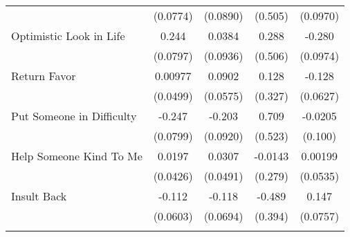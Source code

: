 {\begin{tabular}{l*{4}{c}}
            &    (0.0774)         &    (0.0890)         &     (0.505)         &    (0.0970)         \\
[1em]
Optimistic Look in Life&       0.244\sym{**} &      0.0384         &       0.288         &      -0.280\sym{**} \\
            &    (0.0797)         &    (0.0936)         &     (0.506)         &    (0.0974)         \\
[1em]
Return Favor&     0.00977         &      0.0902         &       0.128         &      -0.128\sym{*}  \\
            &    (0.0499)         &    (0.0575)         &     (0.327)         &    (0.0627)         \\
[1em]
Put Someone in Difficulty&      -0.247\sym{**} &      -0.203\sym{*}  &       0.709         &     -0.0205         \\
            &    (0.0799)         &    (0.0920)         &     (0.523)         &     (0.100)         \\
[1em]
Help Someone Kind To Me&      0.0197         &      0.0307         &     -0.0143         &     0.00199         \\
            &    (0.0426)         &    (0.0491)         &     (0.279)         &    (0.0535)         \\
[1em]
Insult Back &      -0.112         &      -0.118         &      -0.489         &       0.147         \\
            &    (0.0603)         &    (0.0694)         &     (0.394)         &    (0.0757)         \\
\hline\hline
{}\\
\end{tabular}
}
